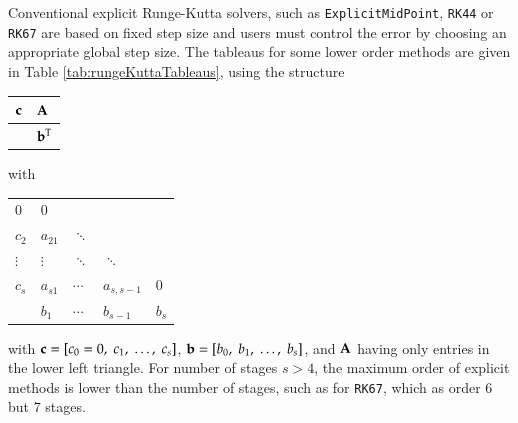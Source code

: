 Conventional explicit Runge-Kutta solvers, such as \texttt{ExplicitMidPoint}, \texttt{RK44} or \texttt{RK67} are based on 
fixed step size and users must control the error by choosing an appropriate global step size. The tableaus for some lower order methods
are given in Table \ref{tab:rungeKuttaTableaus}, using the structure
\begin{center}
\begin{tabular}{p{0.25cm}|p{0.25cm}} 
$\mathbf{c}$ & $\mathbf{A}$ \\ \hline 
~ & $\mathbf{b}^\mathrm{T}$ \\ 
\end{tabular}
\end{center}
with
\begin{center}
\begin{tabular}{p{0.35cm}|p{0.35cm} p{0.35cm} p{0.35cm} p{0.35cm} } %
0 & 0 & & &\\ %
$c_2$ & $a_{21}$ & $\ddots$ & & \\ %
$\vdots$ & $\vdots$ & $\ddots$ & $\ddots$ & \\ %
$c_s$ & $a_{s1}$ & $\cdots$ & $a_{s,s-1}$ & 0 \\ \hline
      & $b_{1}$ & $\cdots$ & $b_{s-1}$ & $b_{s}$ \\ %
\end{tabular} 
\end{center}
with $\mathbf{c} = [c_0=0, \; c_1, \; \ldots, \; c_s]$, $\mathbf{b} = [b_0, \; b_1, \; \ldots, \; b_s]$, and $\mathbf{A}$ having only entries in the 
lower left triangle.
For number of stages $s > 4$, the maximum order of explicit methods is lower than the number of stages, such as for \texttt{RK67}, which as order 6 but 7 stages.
%
